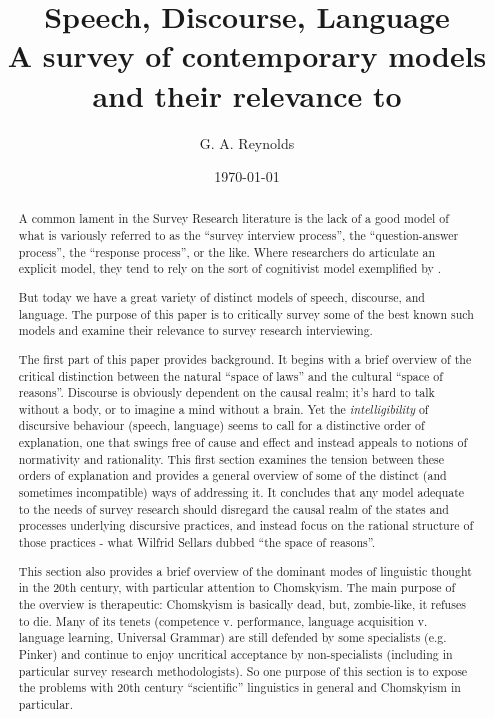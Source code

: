 \documentclass[11pt,twoside]{article}
\title{Speech, Discourse, Language \\
\vspace{12pt} \Large{A survey of contemporary models and their relevance to \\
\SR{}}}
\author{G. A. Reynolds}
\date{\today}
\newcommand{\SR}{Survey Research}
\begin{document}
\maketitle
\nocite{*}

\begin{abstract}
A common lament in the \SR{} literature is the lack of a good model of
what is variously referred to as the ``survey interview process'', the
``question-answer process'', the ``response process'', or the like.
Where researchers do articulate an explicit model, they tend to rely
on the sort of cognitivist model exemplified by \cite{tourangeau_psr}.

But today we have a great variety of distinct models of speech,
discourse, and language.  The purpose of this paper is to critically
survey some of the best known such models and examine their relevance
to survey research interviewing.

The first part of this paper provides background.  It begins with a
brief overview of the critical distinction between the natural ``space
of laws'' and the cultural ``space of reasons''.  Discourse is
obviously dependent on the causal realm; it's hard to talk without a
body, or to imagine a mind without a brain.  Yet the
\textit{intelligibility} of discursive behaviour (speech, language)
seems to call for a distinctive order of explanation, one that swings
free of cause and effect and instead appeals to notions of normativity
and rationality.  This first section examines the tension between
these orders of explanation and provides a general overview of some of
the distinct (and sometimes incompatible) ways of addressing it.  It
concludes that any model adequate to the needs of survey research
should disregard the causal realm of the states and processes
underlying discursive practices, and instead focus on the rational
structure of those practices - what Wilfrid Sellars dubbed ``the space
of reasons''.

This section also provides a brief overview of the dominant modes of
linguistic thought in the 20th century, with particular attention to
Chomskyism.  The main purpose of the overview is therapeutic:
Chomskyism is basically dead, but, zombie-like, it refuses to die.
Many of its tenets (competence v. performance, language acquisition
v. language learning, Universal Grammar) are still defended by some
specialists (e.g. Pinker) and continue to enjoy uncritical acceptance
by non-specialists (including in particular survey research
methodologists).  So one purpose of this section is to expose the
problems with 20th century ``scientific'' linguistics in general and
Chomskyism in particular.


\end{abstract}
\end{document}
